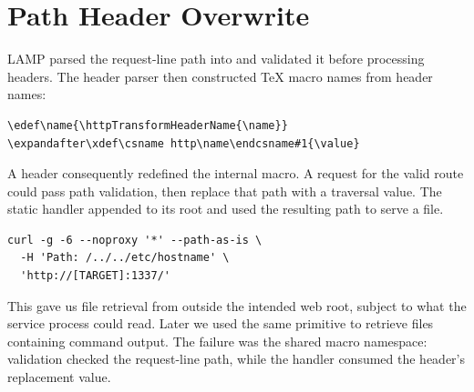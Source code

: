 \section{Path Header Overwrite}
\label{sec:path-header}

LAMP parsed the request-line path into  and
validated it before processing headers. The header parser then constructed
TeX macro names from header names:

\begin{lstlisting}
\edef\name{\httpTransformHeaderName{\name}}
\expandafter\xdef\csname http\name\endcsname#1{\value}
\end{lstlisting}

A  header consequently redefined the internal
 macro. A request for the valid route \code{/}
could pass path validation, then replace that path with a traversal value.
The static handler appended  to its
 root and used the resulting path to serve a file.

\begin{lstlisting}
curl -g -6 --noproxy '*' --path-as-is \
  -H 'Path: /../../etc/hostname' \
  'http://[TARGET]:1337/'
\end{lstlisting}

This gave us file retrieval from outside the intended web root, subject to
what the service process could read. Later we used the same primitive to
retrieve files containing command output. The failure was the shared macro
namespace: validation checked the request-line path, while the handler
consumed the header's replacement value.
